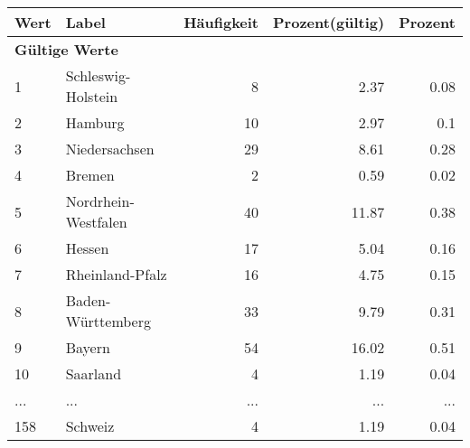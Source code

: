      \begin{longtable}{lXrrr}
     \toprule
     \textbf{Wert} & \textbf{Label} & \textbf{Häufigkeit} & \textbf{Prozent(gültig)} & \textbf{Prozent} \\
     \endhead
     \midrule
     \multicolumn{5}{l}{\textbf{Gültige Werte}}\\
        1 & \multicolumn{1}{X}{Schleswig-Holstein} & %
          \num{8} &
          \num[round-mode=places,round-precision=2]{2.37} &
          \num[round-mode=places,round-precision=2]{0.08} \\
        2 & \multicolumn{1}{X}{Hamburg} & %
          \num{10} &
          \num[round-mode=places,round-precision=2]{2.97} &
          \num[round-mode=places,round-precision=2]{0.1} \\
        3 & \multicolumn{1}{X}{Niedersachsen} & %
          \num{29} &
          \num[round-mode=places,round-precision=2]{8.61} &
          \num[round-mode=places,round-precision=2]{0.28} \\
        4 & \multicolumn{1}{X}{Bremen} & %
          \num{2} &
          \num[round-mode=places,round-precision=2]{0.59} &
          \num[round-mode=places,round-precision=2]{0.02} \\
        5 & \multicolumn{1}{X}{Nordrhein-Westfalen} & %
          \num{40} &
          \num[round-mode=places,round-precision=2]{11.87} &
          \num[round-mode=places,round-precision=2]{0.38} \\
        6 & \multicolumn{1}{X}{Hessen} & %
          \num{17} &
          \num[round-mode=places,round-precision=2]{5.04} &
          \num[round-mode=places,round-precision=2]{0.16} \\
        7 & \multicolumn{1}{X}{Rheinland-Pfalz} & %
          \num{16} &
          \num[round-mode=places,round-precision=2]{4.75} &
          \num[round-mode=places,round-precision=2]{0.15} \\
        8 & \multicolumn{1}{X}{Baden-Württemberg} & %
          \num{33} &
          \num[round-mode=places,round-precision=2]{9.79} &
          \num[round-mode=places,round-precision=2]{0.31} \\
        9 & \multicolumn{1}{X}{Bayern} & %
          \num{54} &
          \num[round-mode=places,round-precision=2]{16.02} &
          \num[round-mode=places,round-precision=2]{0.51} \\
        10 & \multicolumn{1}{X}{Saarland} & %
          \num{4} &
          \num[round-mode=places,round-precision=2]{1.19} &
          \num[round-mode=places,round-precision=2]{0.04} \\
       ... & ... & ... & ... & ... \\
        158 & \multicolumn{1}{X}{Schweiz} & %
          \num{4} &
          \num[round-mode=places,round-precision=2]{1.19} &
          \num[round-mode=places,round-precision=2]{0.04} \\


\end{longtable}
